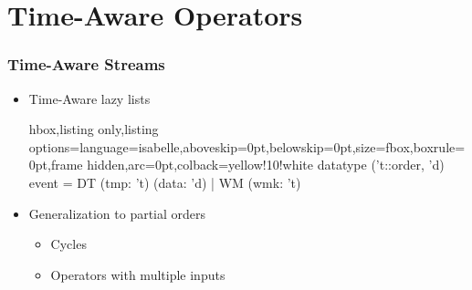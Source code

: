 \documentclass[aspectratio=169,10pt]{beamer}
\begin{document}
\section{Time-Aware Operators}

\begin{frame}[fragile]
  \frametitle{Time-Aware Streams}
  \begin{itemize}
    \item Time-Aware lazy lists
\vspace*{-1ex}
\begin{tcblisting}{hbox,listing only,listing options={language=isabelle,aboveskip=0pt,belowskip=0pt},size=fbox,boxrule=0pt,frame hidden,arc=0pt,colback=yellow!10!white}
datatype ('t::order, 'd) event = DT (tmp: 't) (data: 'd) | WM (wmk: 't)
\end{tcblisting}
\vspace*{-1ex}
          \pause
    \item Generalization to partial orders
          \begin{itemize}
            \item Cycles
            \item Operators with multiple inputs
          \end{itemize}
    \end{itemize}
\end{frame}
\end{document}
